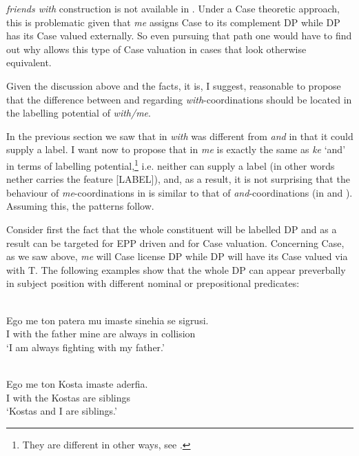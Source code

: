 \documentclass[output=paper]{langsci/langscibook}
\begin{document}
\emph{friends with} construction is not available in . Under a Case
theoretic approach, this is problematic given that \emph{me} assigns Case to
its complement DP while DP has its Case valued externally. So even
pursuing that path one would have to find out why  allows this type
of Case valuation in cases that look otherwise equivalent.

Given the discussion above and the  facts, it is, I suggest,
reasonable to propose that the difference between  and  regarding
\emph{with}-coordinations should be located in the labelling potential of
\emph{with/me}.

In the previous section we saw that in  \emph{with} was different
from \emph{and} in that it could supply a label. I want now to propose that in
 \emph{me} is exactly the same as \emph{ke} \enquote*{and} in terms
of labelling potential,\footnote{They are different in other
    ways, see .} i.e. neither can supply a label (in other words
    nether carries the feature [LABEL]), and, as a result, it is not surprising
    that the behaviour of \emph{me}-coordinations in  is similar to
    that of \emph{and}-coordinations (in  and
    ).  Assuming this, the patterns follow.

Consider first the fact that the whole constituent will be labelled DP and as a
result can be targeted for \gls{EPP} driven  and for Case valuation.  Concerning Case, as
we saw above, \emph{me} will Case license DP while DP will have
its Case valued via  with T. The following examples show that the
whole DP can appear preverbally in subject position with different nominal or
prepositional predicates:

\ea\label{ex:key:29.30} \\
    \gll    Ego me ton patera mu imaste sinehia se sigrusi.\\
            I with the father mine are always in collision\\
    \glt    \enquote*{I am always fighting with my father.}
\z


\ea\label{ex:key:29.31} \\
	\gll    Ego me ton Kosta imaste aderfia.\\
            I with the Kostas are siblings\\
    \glt    \enquote*{Kostas and I are siblings.}
\z
\end{document}
